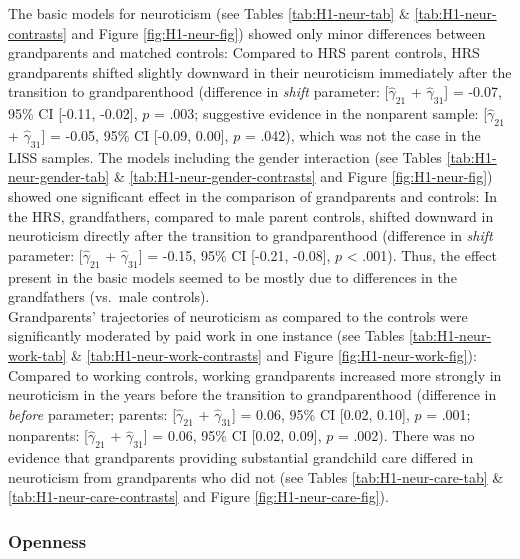 \documentclass[
  english,
  man, noextraspace,floatsintext]{apa7}
\begin{document}
The basic models for neuroticism (see Tables \ref{tab:H1-neur-tab} \& \ref{tab:H1-neur-contrasts} and Figure \ref{fig:H1-neur-fig}) showed only minor differences between grandparents and matched controls: Compared to HRS parent controls, HRS grandparents shifted slightly downward in their neuroticism immediately after the transition to grandparenthood (difference in \emph{shift} parameter: {[}\(\hat{\gamma}_{21}\) + \(\hat{\gamma}_{31}\){]} = -0.07, 95\% CI {[}-0.11, -0.02{]}, \(p\) = .003; suggestive evidence in the nonparent sample: {[}\(\hat{\gamma}_{21}\) + \(\hat{\gamma}_{31}\){]} = -0.05, 95\% CI {[}-0.09, 0.00{]}, \(p\) = .042), which was not the case in the LISS samples. The models including the gender interaction (see Tables \ref{tab:H1-neur-gender-tab} \& \ref{tab:H1-neur-gender-contrasts} and Figure \ref{fig:H1-neur-fig}) showed one significant effect in the comparison of grandparents and controls: In the HRS, grandfathers, compared to male parent controls, shifted downward in neuroticism directly after the transition to grandparenthood (difference in \emph{shift} parameter: {[}\(\hat{\gamma}_{21}\) + \(\hat{\gamma}_{31}\){]} = -0.15, 95\% CI {[}-0.21, -0.08{]}, \(p\) \textless{} .001). Thus, the effect present in the basic models seemed to be mostly due to differences in the grandfathers (vs.~male controls).\\
Grandparents' trajectories of neuroticism as compared to the controls were significantly moderated by paid work in one instance (see Tables \ref{tab:H1-neur-work-tab} \& \ref{tab:H1-neur-work-contrasts} and Figure \ref{fig:H1-neur-work-fig}): Compared to working controls, working grandparents increased more strongly in neuroticism in the years before the transition to grandparenthood (difference in \emph{before} parameter; parents: {[}\(\hat{\gamma}_{21}\) + \(\hat{\gamma}_{31}\){]} = 0.06, 95\% CI {[}0.02, 0.10{]}, \(p\) = .001; nonparents: {[}\(\hat{\gamma}_{21}\) + \(\hat{\gamma}_{31}\){]} = 0.06, 95\% CI {[}0.02, 0.09{]}, \(p\) = .002). There was no evidence that grandparents providing substantial grandchild care differed in neuroticism from grandparents who did not (see Tables \ref{tab:H1-neur-care-tab} \& \ref{tab:H1-neur-care-contrasts} and Figure \ref{fig:H1-neur-care-fig}).

\hypertarget{openness}{%
\subsubsection{Openness}\label{openness}}
\end{document}
